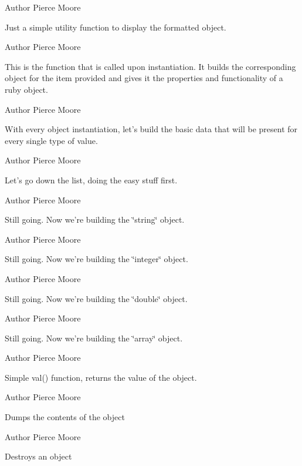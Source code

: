 \begin{DoxyAuthor}{Author}
Pierce Moore
\end{DoxyAuthor}
Just a simple utility function to display the formatted object.

\begin{DoxyAuthor}{Author}
Pierce Moore
\end{DoxyAuthor}
This is the function that is called upon instantiation. It builds the corresponding object for the item provided and gives it the properties and functionality of a ruby object.

\begin{DoxyAuthor}{Author}
Pierce Moore
\end{DoxyAuthor}
With every object instantiation, let's build the basic data that will be present for every single type of value.

\begin{DoxyAuthor}{Author}
Pierce Moore
\end{DoxyAuthor}
Let's go down the list, doing the easy stuff first.

\begin{DoxyAuthor}{Author}
Pierce Moore
\end{DoxyAuthor}
Still going. Now we're building the \char`\"{}string\char`\"{} object.

\begin{DoxyAuthor}{Author}
Pierce Moore
\end{DoxyAuthor}
Still going. Now we're building the \char`\"{}integer\char`\"{} object.

\begin{DoxyAuthor}{Author}
Pierce Moore
\end{DoxyAuthor}
Still going. Now we're building the \char`\"{}double\char`\"{} object.

\begin{DoxyAuthor}{Author}
Pierce Moore
\end{DoxyAuthor}
Still going. Now we're building the \char`\"{}array\char`\"{} object.

\begin{DoxyAuthor}{Author}
Pierce Moore
\end{DoxyAuthor}
Simple val() function, returns the value of the object.

\begin{DoxyAuthor}{Author}
Pierce Moore
\end{DoxyAuthor}
Dumps the contents of the object

\begin{DoxyAuthor}{Author}
Pierce Moore
\end{DoxyAuthor}
Destroys an object

